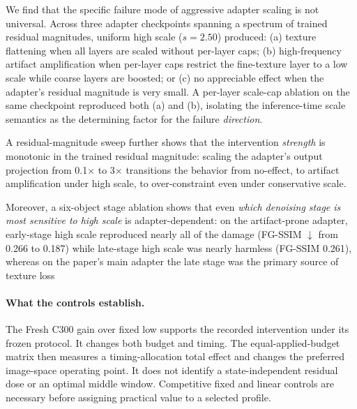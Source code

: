 \documentclass[times,twocolumn,final]{elsarticle}
\providecommand{\DIFadd}[1]{{\protect\color{blue} \sf #1}} %
\providecommand{\DIFdel}[1]{{\protect\color{red} \scriptsize #1}} %
\providecommand{\DIFaddbegin}{} %
\providecommand{\DIFaddend}{} %
\providecommand{\DIFdelend}{} %
\begin{document}
\DIFdel{We find that the specific failure mode of aggressive adapter scaling is not universal. Across three adapter checkpoints spanning a spectrum of trained residual magnitudes, uniform high scale ($s = 2.50$) produced: (a) texture flattening when all layers are scaled without per-layer caps; (b) high-frequency artifact amplification when per-layer caps restrict the fine-texture layer to a low scale while coarse layers are boosted; or (c) no appreciable effect when the adapter's residual magnitude is very small. A per-layer scale-cap ablation on the same checkpoint reproduced both (a) and (b), isolating the inference-time scale semantics as the determining factor for the failure \emph{direction}.
}%

\DIFdel{A residual-magnitude sweep further shows that the intervention \emph{strength} is monotonic in the trained residual magnitude: scaling the adapter's output projection from 0.1$\times$ to 3$\times$ transitions the behavior from no-effect, to artifact amplification under high scale, to over-constraint even under conservative scale.
}%

\DIFdel{Moreover, a six-object stage ablation shows that even \emph{which denoising stage is most sensitive to high scale} is adapter-dependent: on the artifact-prone adapter, early-stage high scale reproduced nearly all of the damage (FG-SSIM $\downarrow$ from 0.266 to 0.187) while late-stage high scale was nearly harmless (FG-SSIM 0.261), whereas on the paper's main adapter the late stage was the primary source of texture loss}\DIFdelend \DIFaddbegin \paragraph{What the controls establish.}
\DIFadd{The Fresh C300 gain over fixed low supports the recorded intervention under its frozen protocol. It changes both budget and timing. The equal-applied-budget matrix then measures a timing-allocation total effect and changes the preferred image-space operating point. It does not identify a state-independent residual dose or an optimal middle window. Competitive fixed and linear controls are necessary before assigning practical value to a selected profile}\DIFaddend .
\end{document}
